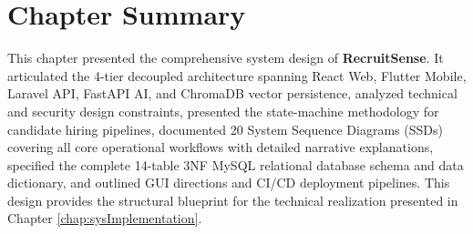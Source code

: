 \section{Chapter Summary}
This chapter presented the comprehensive system design of \textbf{RecruitSense}. It articulated the 4-tier decoupled architecture spanning React Web, Flutter Mobile, Laravel API, FastAPI AI, and ChromaDB vector persistence, analyzed technical and security design constraints, presented the state-machine methodology for candidate hiring pipelines, documented 20 System Sequence Diagrams (SSDs) covering all core operational workflows with detailed narrative explanations, specified the complete 14-table 3NF MySQL relational database schema and data dictionary, and outlined GUI directions and CI/CD deployment pipelines. This design provides the structural blueprint for the technical realization presented in Chapter \ref{chap:sysImplementation}.
